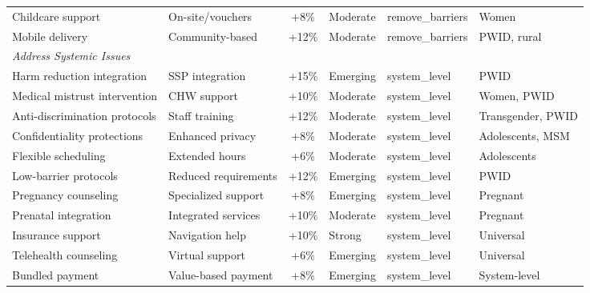 \begin{table}[H]
\begin{tabular}{lp{3cm}cllp{4cm}}
Childcare support & On-site/vouchers & +8\% & Moderate & remove\_barriers & Women \\
Mobile delivery & Community-based & +12\% & Moderate & remove\_barriers & PWID, rural \\
\midrule
\multicolumn{6}{l}{\textit{Address Systemic Issues}} \\
Harm reduction integration & SSP integration & +15\% & Emerging & system\_level & PWID \\
Medical mistrust intervention & CHW support & +10\% & Moderate & system\_level & Women, PWID \\
Anti-discrimination protocols & Staff training & +12\% & Moderate & system\_level & Transgender, PWID \\
Confidentiality protections & Enhanced privacy & +8\% & Moderate & system\_level & Adolescents, MSM \\
Flexible scheduling & Extended hours & +6\% & Moderate & system\_level & Adolescents \\
Low-barrier protocols & Reduced requirements & +12\% & Emerging & system\_level & PWID \\
Pregnancy counseling & Specialized support & +8\% & Emerging & system\_level & Pregnant \\
Prenatal integration & Integrated services & +10\% & Moderate & system\_level & Pregnant \\
Insurance support & Navigation help & +10\% & Strong & system\_level & Universal \\
Telehealth counseling & Virtual support & +6\% & Emerging & system\_level & Universal \\
Bundled payment & Value-based payment & +8\% & Emerging & system\_level & System-level \\
\bottomrule
\end{tabular}
\end{table}




